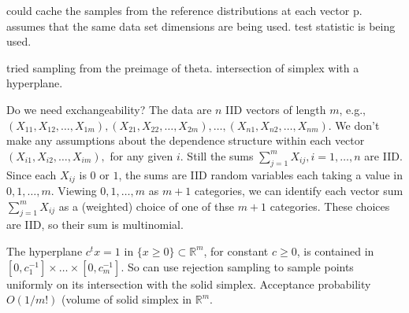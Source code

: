 \documentclass{article}
\begin{document}
could cache the samples from the reference distributions at each
vector p. assumes that the same data set dimensions are being
used. test statistic is being used.

tried sampling from the preimage of theta. intersection of simplex
with a hyperplane.

Do we need exchangeability? The data are $n$ IID vectors of length
$m$, e.g.,
$(X_{11},X_{12},\ldots,X_{1m}), (X_{21},X_{22},\ldots,X_{2m}), \ldots,
(X_{n1},X_{n2},\ldots,X_{nm})$. We don't make any assumptions about
the dependence structure within each vector
$(X_{i1},X_{i2},\ldots,X_{im}),$ for any given $i$. Still the sums
$\sum_{j=1}^mX_{ij}, i=1,\ldots,n$ are IID. Since each $X_{ij}$ is $0$
or $1$, the sums are IID random variables each taking a value in
$0,1,\ldots,m$. Viewing $0,1,\ldots,m$ as $m+1$ categories, we can
identify each vector sum $\sum_{j=1}^mX_{ij}$ as a (weighted) choice
of one of thse $m+1$ categories. These choices are IID, so their sum
is multinomial. 




The hyperplane $c^tx=1$ in $\{x\ge 0\}\subset\mathbb{R}^m$, for constant $c\ge 0$, is contained in $[0,c_1^{-1}]\times\ldots\times[0,c_m^{-1}]$. So can use rejection sampling to sample points uniformly on its intersection with the solid simplex. Acceptance probability $O(1/m!)$ (volume of solid simplex in $\mathbb{R}^m$.
\end{document}

